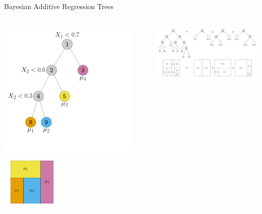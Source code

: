 \documentclass[aspectratio=199]{beamer}
\begin{document}
\begin{frame}{Bayesian Additive Regression Trees}
\begin{columns}
\begin{column}{0.35\textwidth}
\centering
\includegraphics[width = 0.9\textwidth]{figures/old_decision_rule}
\includegraphics[width = 0.4\textwidth]{figures/old_partition}
\end{column}
\begin{column}{0.6\textwidth}
\centering
\includegraphics[width = \textwidth]{figures/sum_of_trees}
\end{column}

\end{columns}
\end{frame}
\end{document}
